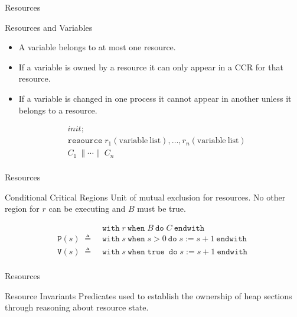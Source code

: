 \documentclass{beamer}
\newcommand{\mtt}[1]{
  \mathtt{#1}\;
}
\begin{document}
\begin{frame}{Resources}
  \begin{block}{Resources and Variables}
    \begin{itemize}
    \item{
        A variable belongs to at most one resource.
    }

    \item{
        If a variable is owned by a resource it can only appear in a CCR for that resource.
    }

    \item{
        If a variable is changed in one process it cannot appear in another unless it belongs to a resource.
    }
    \end{itemize}
  \end{block}
  \begin{example}
    \begin{align*}
      & init;\\
      & \mtt{resource} r_1\mathrm{(variable\ list)},\ldots,r_n\mathrm{(variable\ list)} \\
      & \mathit{C_1}\ \| \cdots \|\ \mathit{C_n}\\
    \end{align*}
  \end{example}

\end{frame}


\begin{frame}{Resources}
  \begin{block}{Conditional Critical Regions}
    Unit of mutual exclusion for resources. No other region for $r$ can be executing and $B$ must be true.
  \end{block}

  \begin{example}
    \begin{align*}
      \; &\mtt{with} r\ \mtt{when} B\ \mtt{do} C\ \mtt{endwith}\\
      \mathtt{P}(s)\; \triangleq\; &\mtt{with} s\ \mtt{when} s > 0\ \mtt{do} s := s + 1\ \mtt{endwith}\\
      \mathtt{V}(s)\; \triangleq\; &\mtt{with} s\ \mtt{when} \mtt{true}\ \mtt{do} s := s + 1\ \mtt{endwith}\\
    \end{align*}
  \end{example}
\end{frame}


\begin{frame}{Resources}
  \begin{block}{Resource Invariants}
    Predicates used to establish the ownership of heap sections through reasoning about resource state.
  \end{block}
\end{frame}
\end{document}

